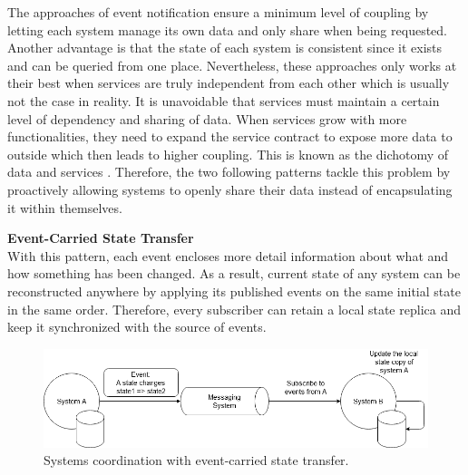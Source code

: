 The approaches of event notification ensure a minimum level of coupling by letting each system manage its own data and only share when being requested. Another advantage is that the state of each system is consistent since it exists and can be queried from one place. Nevertheless, these approaches only works at their best when services are truly independent from each other which is usually not the case in reality. It is unavoidable that services must maintain a certain level of dependency and sharing of data. When services grow with more functionalities, they need to expand the service contract to expose more data to outside which then leads to higher coupling. This is known as the dichotomy of data and services \cite{stopford2018designing}. Therefore, the two following patterns tackle this problem by proactively allowing systems to openly share their data instead of encapsulating it within themselves.

\textbf{Event-Carried State Transfer}\\
With this pattern, each event encloses more detail information about what and how something has been changed. As a result, current state of any system can be reconstructed anywhere by applying its published events on the same initial state in the same order. Therefore, every subscriber can retain a local state replica and keep it synchronized with the source of events.

\begin{figure}[h]
	\includegraphics[width=\linewidth]{images/eventstatetransfer.png}
	\caption{Systems coordination with event-carried state transfer.}
	\label{fig:eventstatetransfer}
\end{figure}


